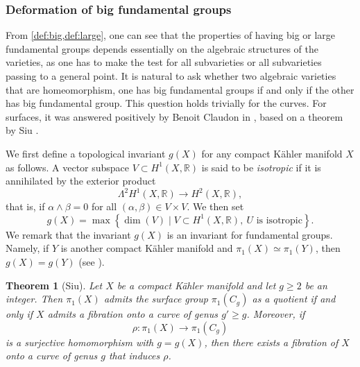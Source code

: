 \documentclass[english]{amsproc}
\theoremstyle{plain}
\newtheorem{thm}{Theorem}[section]
\theoremstyle{definition}
\theoremstyle{remark}
\theoremstyle{plain}
\numberwithin{equation}{thm} %
\begin{document}


\subsubsection{Deformation of big fundamental groups}
From \cref{def:big,def:large}, one can see that the properties of having big or large fundamental groups  depends essentially on the algebraic structures of the varieties, as one has to make the test for all subvarieties or all subvarieties passing to a general point.  It is natural to ask whether two algebraic varieties that are  homeomorphism, one has big fundamental groups if and only if the other has big fundamental group. This question holds trivially for the curves. For surfaces, it was  answered positively by Benoit Claudon in  \cite{Cla10}, based on a theorem by Siu \cite{Siu87}.

We first define a topological invariant $g(X)$ for any compact K\"ahler manifold $X$ as follows.  
A vector subspace $V \subset H^1(X,\mathbb{R})$ is said to be \emph{isotropic} 
if it is annihilated by the exterior product
\[
\Lambda^2 H^1(X,\mathbb{R}) \longrightarrow H^2(X,\mathbb{R}),
\]
that is, if $\alpha \wedge \beta = 0$ for all $(\alpha,\beta) \in V \times V$.
We then set
\[
g(X) = \max \left\{ \dim(V) \mid V \subset H^1(X,\mathbb{R}),\ 
U \text{ is isotropic} \right\}.
\] 
We remark that the invariant $g(X)$ is an invariant for fundamental groups. Namely,     if $Y$ is another  compact K\"ahler manifold and $\pi_1(X)\simeq \pi_1(Y)$, then $g(X)=g(Y)$ (see \cite{ABCKT,Py25}). 
\begin{thm}[Siu] \label{thm:Siu}
	Let $X$ be a compact K\"ahler manifold and let $g \geq 2$ be an integer. 
	Then $\pi_1(X)$ admits the surface group $\pi_1(C_g)$ as a quotient 
	if and only if $X$ admits a fibration onto a  curve of genus 
	$g' \geq g$. 
	Moreover, if 
	\[
	\rho : \pi_1(X) \longrightarrow \pi_1(C_g)
	\]
	is a surjective homomorphism with $g = g(X)$, then there exists a 
	fibration of $X$ onto a curve of genus $g$ that induces $\rho$. 
\end{thm}
\end{document}
